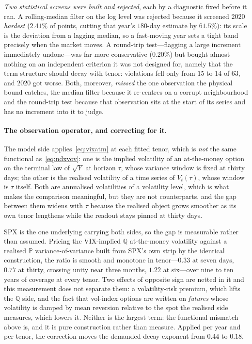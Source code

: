 \documentclass[11pt]{article}
\providecommand{\1}{\mathbf 1}
\begin{document}
\emph{Two statistical screens were built and rejected}, each by a diagnostic fixed before it ran.
A rolling-median filter on the log level was rejected because it screened $2020$ \emph{hardest}
($2.41\%$ of points, cutting that year's $180$-day estimate by $61.5\%$): its scale is the deviation
from a lagging median, so a fast-moving year sets a tight band precisely when the market moves. A
round-trip test---flagging a large increment immediately undone---was far more conservative
($0.20\%$) but bought almost nothing on an independent criterion it was not designed for, namely that
the term structure should decay with tenor: violations fell only from $15$ to $14$ of $63$, and $2020$
got worse. Both, moreover, \emph{missed} the one observation the physical bound catches, the median
filter because it re-centres on a corrupt neighbourhood and the round-trip test because that
observation sits at the start of its series and has no increment into it to judge.

\paragraph{The observation operator, and correcting for it.} The model side applies~\eqref{eq:vixatm}
at each fitted tenor, which is \emph{not} the same functional as~\eqref{eq:ndxvov}: one is the implied
volatility of an at-the-money option on the terminal law of $\sqrt Y$ at horizon $\tau$, whose
variance window is fixed at thirty days; the other is the realised volatility of a time series of
$V_t(\tau)$, whose window is $\tau$ itself. Both are annualised volatilities of a volatility level,
which is what makes the comparison meaningful, but they are not counterparts, and the gap between
them widens with $\tau$ because the realised object grows smoother as its own tenor lengthens while
the readout stays pinned at thirty days.

SPX is the one underlying carrying both sides, so the gap is measurable rather than assumed. Pricing
the VIX-implied $\mathbb Q$ at-the-money volatility against a realised $\mathbb P$
variance-of-variance built from SPX's own strip by the identical construction, the ratio is smooth
and monotone in tenor---$0.33$ at seven days, $0.77$ at thirty, crossing unity near three months,
$1.22$ at six---over nine to ten years of coverage at every tenor. Two effects of opposite sign are
netted in it and this measurement does not separate them: a volatility-risk premium, which lifts the
$\mathbb Q$ side, and the fact that vol-index options are written on \emph{futures} whose volatility
is damped by mean reversion relative to the spot the realised side measures, which lowers it. Neither
is the largest term: the functional mismatch above is, and it is pure construction rather than
measure. Applied per year and per tenor, the correction moves the demanded decay exponent from $0.44$
to $0.18$.
\end{document}

